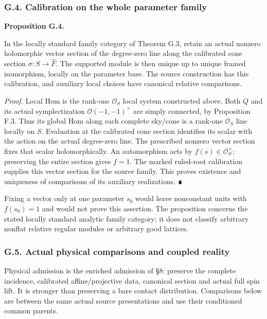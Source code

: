 \documentclass[
  english,
  11pt,
  reqno]{amsart}
\makeatletter
\newcommand{\pandocstatementheading}[1]{%
  \par\addpenalty{\@beginparpenalty}%
  \addvspace{.5\baselineskip plus .2\baselineskip minus .2\baselineskip}%
  {\normalfont\bfseries #1\par}%
  \nobreak\@afterindenttrue\@afterheading
}
\makeatother
\begin{document}
\subsubsection{G.4. Calibration on the whole parameter
family}\label{g.4.-calibration-on-the-whole-parameter-family}

\pandocstatementheading{\protect{}\label{prop:gg-module-relative-framing}Proposition G.4.}

In the locally standard family category of Theorem G.3, retain an actual
nonzero holomorphic vector section of the degree-zero line along the
calibrated cone section \(\sigma:S\to\widehat F\). The supported module
is then unique up to unique framed isomorphism, locally on the parameter
base. The source construction has this calibration, and auxiliary local
choices have canonical relative comparisons.

\emph{Proof.} Local Hom is the rank-one \(\mathcal O_S\) local system
constructed above. Both \(Q\) and its actual symplectization
\(\mathcal O(-1,-1)^\times\) are simply connected, by Proposition F.3.
Thus its global Hom along each complete sky/cone is a rank-one
\(\mathcal O_S\) line locally on \(S\). Evaluation at the calibrated
cone section identifies its scalar with the action on the actual
degree-zero line. The prescribed nonzero vector section fixes that
scalar holomorphically. An automorphism acts by
\(f(s)\in\mathcal O_S^\times\); preserving the entire section gives
\(f=1\). The marked ruled-root calibration supplies this vector section
for the source family. This proves existence and uniqueness of
comparisons of its auxiliary realizations. ∎

Fixing a vector only at one parameter \(s_0\) would leave nonconstant
units with \(f(s_0)=1\) and would not prove this assertion. The
proposition concerns the stated locally standard analytic family
category; it does not classify arbitrary nonflat relative regular
modules or arbitrary good lattices.

\protect{}\label{sec:gg-op-physical-comparisons}

\subsubsection{G.5. Actual physical comparisons and coupled
reality}\label{g.5.-actual-physical-comparisons-and-coupled-reality}

Physical admission is the enriched admission of §8: preserve the
complete incidence, calibrated affine/projective data, canonical section
and actual full spin lift. It is stronger than preserving a bare contact
distribution. Comparisons below are between the same actual source
presentations and use their conditioned common parents.
\end{document}
